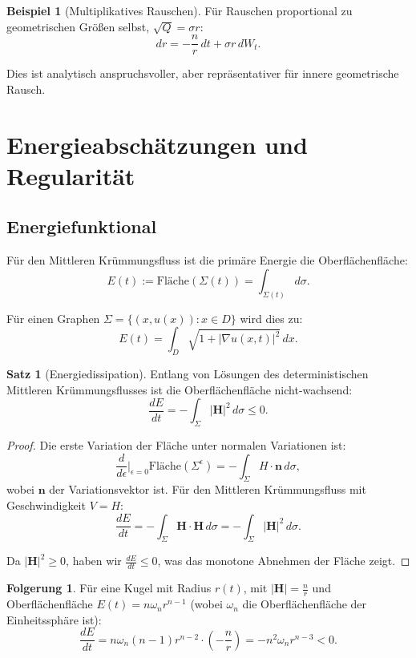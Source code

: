 \documentclass[a4paper,12pt]{article}
\theoremstyle{definition}
\newtheorem{beispiel}{Beispiel}
\newtheorem{satz}{Satz}
\newtheorem{folgerung}{Folgerung}
\begin{document}
\begin{beispiel}[Multiplikatives Rauschen]
	Für Rauschen proportional zu geometrischen Größen selbst, $\sqrt{Q} = \sigma r$:
	\[
	dr = -\frac{n}{r} \, dt + \sigma r \, dW_t.
	\]
	
	Dies ist analytisch anspruchsvoller, aber repräsentativer für innere geometrische Rausch.
\end{beispiel}

\section{Energieabschätzungen und Regularität}
\label{sec:energy}

\subsection{Energiefunktional}

Für den Mittleren Krümmungsfluss ist die primäre Energie die Oberflächenfläche:
\[
E(t) := \text{Fläche}(\Sigma(t)) = \int_{\Sigma(t)} d\sigma.
\]

Für einen Graphen $\Sigma = \{(x, u(x)) : x \in D\}$ wird dies zu:
\[
E(t) = \int_D \sqrt{1 + |\nabla u(x,t)|^2} \, dx.
\]

\begin{satz}[Energiedissipation]
	\label{thm:energy_dissipation}
	Entlang von Lösungen des deterministischen Mittleren Krümmungsflusses ist die Oberflächenfläche nicht-wachsend:
	\[
	\frac{dE}{dt} = -\int_\Sigma |\mathbf{H}|^2 \, d\sigma \leq 0.
	\]
\end{satz}

\begin{proof}
	Die erste Variation der Fläche unter normalen Variationen ist:
	\[
	\frac{d}{d\epsilon}\bigg|_{\epsilon=0} \text{Fläche}(\Sigma^\epsilon) = -\int_\Sigma H \cdot \mathbf{n} \, d\sigma,
	\]
	wobei $\mathbf{n}$ der Variationsvektor ist. Für den Mittleren Krümmungsfluss mit Geschwindigkeit $V = H$:
	\[
	\frac{dE}{dt} = -\int_\Sigma \mathbf{H} \cdot \mathbf{H} \, d\sigma = -\int_\Sigma |\mathbf{H}|^2 \, d\sigma.
	\]
	
	Da $|\mathbf{H}|^2 \geq 0$, haben wir $\frac{dE}{dt} \leq 0$, was das monotone Abnehmen der Fläche zeigt.
\end{proof}

\begin{folgerung}
	Für eine Kugel mit Radius $r(t)$, mit $|\mathbf{H}| = \frac{n}{r}$ und Oberflächenfläche $E(t) = n\omega_{n} r^{n-1}$ (wobei $\omega_n$ die Oberflächenfläche der Einheitssphäre ist):
	\[
	\frac{dE}{dt} = n\omega_n (n-1) r^{n-2} \cdot (-\frac{n}{r}) = -n^2 \omega_n r^{n-3} < 0.
	\]
\end{folgerung}
\end{document}
